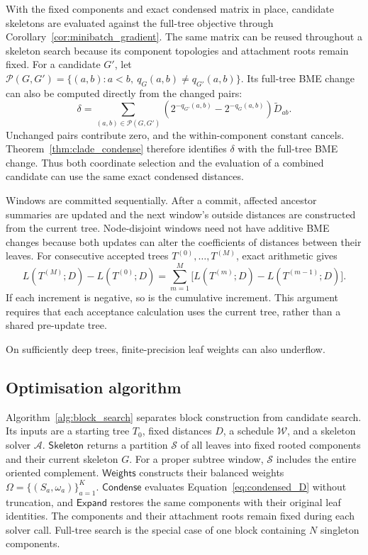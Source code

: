 \documentclass[11pt,a4paper]{article}
\makeatletter
\newcommand{\proc}[1]{\mathsf{#1}}
\DeclareRobustCommand{\_}{\ifmmode\nfss@text{\textunderscore}\else\textunderscore\allowbreak\fi}
\theoremstyle{definition}
\makeatother
\begin{document}
With the fixed components and exact condensed matrix in place, candidate skeletons are evaluated against the full-tree objective through Corollary~\ref{cor:minibatch_gradient}.
The same matrix can be reused throughout a skeleton search because its component topologies and attachment roots remain fixed.
For a candidate $G'$, let $\mathcal P(G,G')=\{(a,b):a<b,\ q_G(a,b)\ne q_{G'}(a,b)\}$.
Its full-tree BME change can also be computed directly from the changed pairs:
\begin{equation}
 \delta=\sum_{(a,b)\in\mathcal P(G,G')}
   \left(2^{-q_{G'}(a,b)}-2^{-q_G(a,b)}\right)
   \widetilde D_{ab}.
 \label{eq:changed_pairs}
\end{equation}
Unchanged pairs contribute zero, and the within-component constant cancels.
Theorem~\ref{thm:clade_condense} therefore identifies $\delta$ with the full-tree BME change.
Thus both coordinate selection and the evaluation of a combined candidate can use the same exact condensed distances.

Windows are committed sequentially.
After a commit, affected ancestor summaries are updated and the next window's outside distances are constructed from the current tree.
Node-disjoint windows need not have additive BME changes because both updates can alter the coefficients of distances between their leaves.
For consecutive accepted trees $T^{(0)},\ldots,T^{(M)}$, exact arithmetic gives
\begin{equation}
 L(T^{(M)};D)-L(T^{(0)};D)
 =\sum_{m=1}^M\bigl[L(T^{(m)};D)-L(T^{(m-1)};D)\bigr].
 \label{eq:telescoping}
\end{equation}
If each increment is negative, so is the cumulative increment.
This argument requires that each acceptance calculation uses the current tree, rather than a shared pre-update tree.

On sufficiently deep trees, finite-precision leaf weights can also underflow.

\subsection{Optimisation algorithm}
\label{sec:optimizer}

Algorithm~\ref{alg:block_search} separates block construction from candidate search.
Its inputs are a starting tree $T_0$, fixed distances $D$, a schedule $\mathcal W$, and a skeleton solver $\mathcal A$.
$\proc{Skeleton}$ returns a partition $\mathcal S$ of all leaves into fixed rooted components and their current skeleton $G$.
For a proper subtree window, $\mathcal S$ includes the entire oriented complement.
$\proc{Weights}$ constructs their balanced weights $\Omega=\{(S_a,\omega_a)\}_{a=1}^K$.
$\proc{Condense}$ evaluates Equation~\eqref{eq:condensed_D} without truncation, and $\proc{Expand}$ restores the same components with their original leaf identities.
The components and their attachment roots remain fixed during each solver call.
Full-tree search is the special case of one block containing $N$ singleton components.
\end{document}
